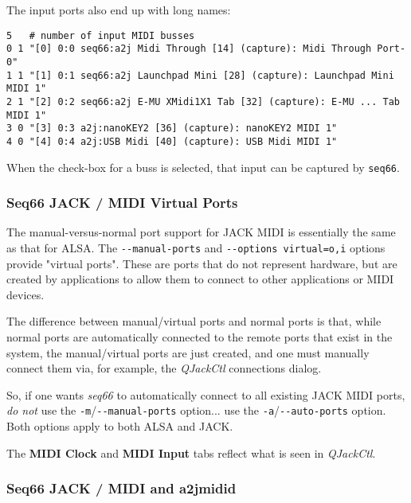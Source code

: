   The input ports also end up with long names:

   \begin{verbatim}
5   # number of input MIDI busses
0 1 "[0] 0:0 seq66:a2j Midi Through [14] (capture): Midi Through Port-0"
1 1 "[1] 0:1 seq66:a2j Launchpad Mini [28] (capture): Launchpad Mini MIDI 1"
2 1 "[2] 0:2 seq66:a2j E-MU XMidi1X1 Tab [32] (capture): E-MU ... Tab MIDI 1"
3 0 "[3] 0:3 a2j:nanoKEY2 [36] (capture): nanoKEY2 MIDI 1"
4 0 "[4] 0:4 a2j:USB Midi [40] (capture): USB Midi MIDI 1"
   \end{verbatim}

   When the check-box for a buss is selected, that input can be captured by
   \texttt{seq66}.

\subsubsection{Seq66 JACK / MIDI Virtual Ports}
\label{subsubsec:jack_midi_virtual_ports}

   The manual-versus-normal port support for JACK MIDI is essentially the same
   as that for ALSA.
   The \texttt{-{}-manual-ports} and
   \texttt{-{}-options virtual=o,i} options provide
   "virtual ports".  These are ports that do not represent
   hardware, but are created by applications to allow them to connect to other
   applications or MIDI devices.

   The difference between manual/virtual ports and normal ports is that, while
   normal ports are automatically connected to the remote ports that exist in
   the system, the manual/virtual ports are just created, and one must
   manually connect them via, for example, the
   \textsl{QJackCtl} connections dialog.

   So, if one wants \textsl{seq66} to automatically connect to all existing
   JACK MIDI ports, \textsl{do not} use the
   \texttt{-m}/\texttt{-{}-manual-ports} option... use the
   \texttt{-a}/\texttt{-{}-auto-ports} option.  Both options apply to both
   ALSA and JACK.

   The \textbf{MIDI Clock} and \textbf{MIDI Input} tabs reflect
   what is seen in \textsl{QJackCtl}.

\subsubsection{Seq66 JACK / MIDI and a2jmidid}
\label{subsubsec:jack_midi_a2jmidid}

